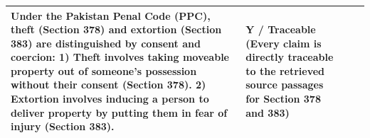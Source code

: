 \documentclass[11pt]{article}
\begin{document}
\begin{table}[H]
\begin{tabularx}{\textwidth}{|l|>{\raggedright\arraybackslash\hsize=1.1\hsize}X|>{\raggedright\arraybackslash\hsize=1.1\hsize}X|>{\raggedright\arraybackslash\hsize=0.8\hsize}X|}
Under the Pakistan Penal Code (PPC), theft (Section 378) and extortion (Section 383) are distinguished by consent and coercion: 1) Theft involves taking moveable property out of someone's possession without their consent (Section 378). 2) Extortion involves inducing a person to deliver property by putting them in fear of injury (Section 383). & 
\textbf{Y / Traceable} \newline (Every claim is directly traceable to the retrieved source passages for Section 378 and 383) \\ \hline
\end{tabularx}
\end{table}
\end{document}
